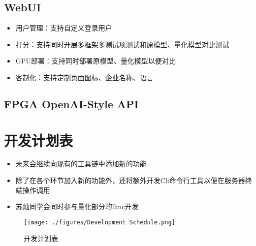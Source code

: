 \documentclass[AutoFakeBold,AutoFakeSlant,language=chinese,degree=bachelor]{sustechthesis}
\begin{document}
\subsection{WebUI}
\begin{itemize}
    \item 用户管理：支持自定义登录用户
    \item 打分：支持同时开展多框架多测试项测试和原模型、量化模型对比测试
    \item GPU部署：支持同时部署原模型、量化模型以便对比
    \item 客制化：支持定制页面图标、企业名称、语言
\end{itemize}

\subsection{FPGA OpenAI-Style API}

\section{开发计划表}
\begin{itemize}
    \item 未来会继续向现有的工具链中添加新的功能
    \item 除了在各个环节加入新的功能外，还将额外开发Cli命令行工具以便在服务器终端操作调用
    \item 苏灿同学会同时参与量化部分的llmc开发
\end{itemize}
\begin{figure}[H]
    \centering
    \texttt{[image: ./figures/Development Schedule.png]}
    \caption{开发计划表}
\end{figure}
\end{document}
